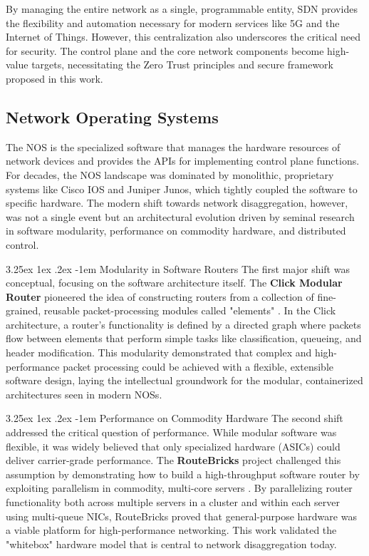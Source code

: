 \documentclass[12pt, a4paper, reqno, oneside]{book}
\makeatletter
\renewcommand\paragraph{\@startsection{paragraph}{5}{\z@}%
  {3.25ex \@plus1ex \@minus.2ex}%
  {-1em}%
  {\normalfont\normalsize\bfseries}}
\makeatother
\begin{document}
By managing the entire network as a single, programmable entity, SDN provides the flexibility and automation necessary for modern services like 5G and the Internet of Things. However, this centralization also underscores the critical need for security. The control plane and the core network components become high-value targets, necessitating the Zero Trust principles and secure framework proposed in this work.



\subsection{Network Operating Systems}
\label{sec:nos}

The NOS is the specialized software that manages the hardware resources of network devices and provides the APIs for implementing control plane functions. For decades, the NOS landscape was dominated by monolithic, proprietary systems like Cisco IOS and Juniper Junos, which tightly coupled the software to specific hardware. The modern shift towards network disaggregation, however, was not a single event but an architectural evolution driven by seminal research in software modularity, performance on commodity hardware, and distributed control.

\paragraph{Modularity in Software Routers}
The first major shift was conceptual, focusing on the software architecture itself. The \textbf{Click Modular Router} pioneered the idea of constructing routers from a collection of fine-grained, reusable packet-processing modules called "elements" \cite{kohler2000click}. In the Click architecture, a router's functionality is defined by a directed graph where packets flow between elements that perform simple tasks like classification, queueing, and header modification. This modularity demonstrated that complex and high-performance packet processing could be achieved with a flexible, extensible software design, laying the intellectual groundwork for the modular, containerized architectures seen in modern NOSs.

\paragraph{Performance on Commodity Hardware}
The second shift addressed the critical question of performance. While modular software was flexible, it was widely believed that only specialized hardware (ASICs) could deliver carrier-grade performance. The \textbf{RouteBricks} project challenged this assumption by demonstrating how to build a high-throughput software router by exploiting parallelism in commodity, multi-core servers \cite{dobrescu2009routebricks}. By parallelizing router functionality both across multiple servers in a cluster and within each server using multi-queue NICs, RouteBricks proved that general-purpose hardware was a viable platform for high-performance networking. This work validated the "whitebox" hardware model that is central to network disaggregation today.
\end{document}
